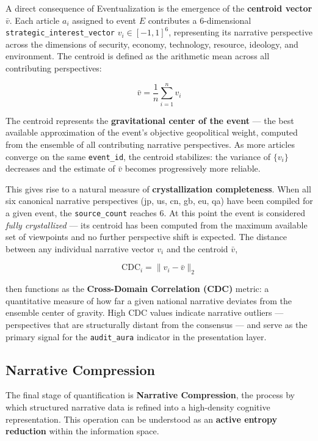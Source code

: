 \documentclass[11pt,a4paper]{article}
\begin{document}
A direct consequence of Eventualization is the emergence of the
\textbf{centroid vector} $\bar{v}$. Each article $a_i$ assigned to
event $E$ contributes a 6-dimensional \texttt{strategic\_interest\_vector}
$v_i \in [-1, 1]^6$, representing its narrative perspective across the
dimensions of security, economy, technology, resource, ideology, and
environment. The centroid is defined as the arithmetic mean across all
contributing perspectives:

\begin{equation}
  \bar{v} = \frac{1}{n} \sum_{i=1}^{n} v_i
\end{equation}

The centroid represents the \textbf{gravitational center of the
event} — the best available approximation of the event's objective
geopolitical weight, computed from the ensemble of all contributing
narrative perspectives. As more articles converge on the same
\texttt{event\_id}, the centroid stabilizes: the variance of
$\{v_i\}$ decreases and the estimate of $\bar{v}$ becomes
progressively more reliable.

This gives rise to a natural measure of \textbf{crystallization
completeness}. When all six canonical narrative perspectives
(jp, us, cn, gb, eu, qa) have been compiled for a given event,
the \texttt{source\_count} reaches 6. At this point the event is
considered \emph{fully crystallized} — its centroid has been
computed from the maximum available set of viewpoints and no
further perspective shift is expected. The distance between any
individual narrative vector $v_i$ and the centroid $\bar{v}$,

\begin{equation}
  \text{CDC}_i = \| v_i - \bar{v} \|_2
\end{equation}

then functions as the \textbf{Cross-Domain Correlation (CDC)} metric:
a quantitative measure of how far a given national narrative deviates
from the ensemble center of gravity. High CDC values indicate
narrative outliers — perspectives that are structurally distant from
the consensus — and serve as the primary signal for the
\texttt{audit\_aura} indicator in the presentation layer.

\subsection{Narrative Compression}

The final stage of quantification is \textbf{Narrative Compression},
the process by which structured narrative data is refined into a
high-density cognitive representation. This operation can be understood
as an \textbf{active entropy reduction} within the information space.
\end{document}
